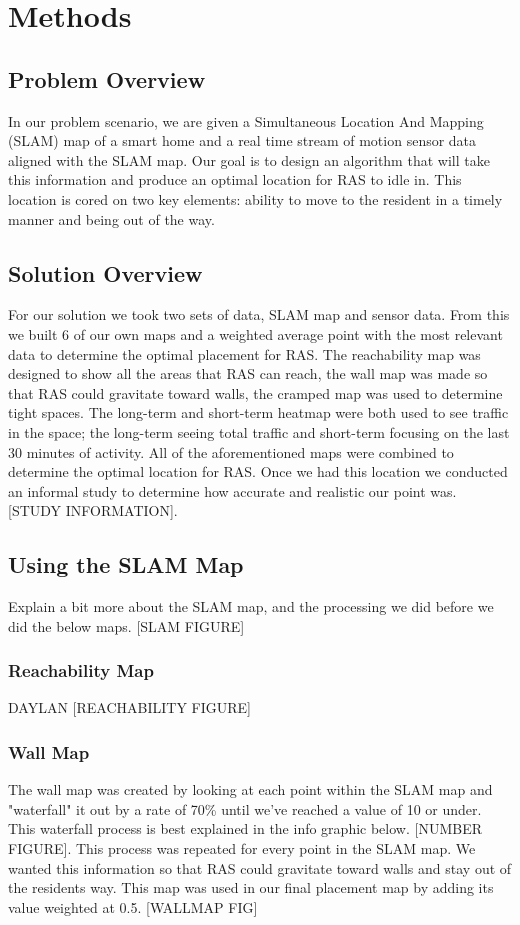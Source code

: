 \documentclass[11pt, draft, a4paper]{IEEEtran}
\begin{document}
\section{Methods}


\subsection{Problem Overview}
In our problem scenario, we are given a Simultaneous Location And Mapping (SLAM) map of a smart home and a real time stream of motion sensor data aligned with the SLAM map. Our goal is to design an algorithm that will take this information and produce an optimal location for RAS to idle in. This location is cored on two key elements: ability to move to the resident in a timely manner and being out of the way. 


\subsection{Solution Overview}
For our solution we took two sets of data, SLAM map and sensor data. From this we built 6 of our own maps and a weighted average point with the most relevant data to determine the optimal placement for RAS. The reachability map was designed to show all the areas that RAS can reach, the wall map was made so that RAS could gravitate toward walls, the cramped map was used to determine tight spaces. The long-term and short-term heatmap were both used to see traffic in the space; the long-term seeing total traffic and short-term focusing on the last 30 minutes of activity. All of the aforementioned maps were combined to determine the optimal location for RAS. Once we had this location we conducted an informal study to determine how accurate and realistic our point was. [STUDY INFORMATION].


\subsection{Using the SLAM Map}
Explain a bit more about the SLAM map, and the processing we did before we did the below maps.
[SLAM FIGURE]

\subsubsection{Reachability Map}
DAYLAN
[REACHABILITY FIGURE]


\subsubsection{Wall Map}
The wall map was created by looking at each point within the SLAM map and "waterfall" it out by a rate of 70\% until we've reached a value of 10 or under. This waterfall process is best explained in the info graphic below. [NUMBER FIGURE]. This process was repeated for every point in the SLAM map. We wanted this information so that RAS could gravitate toward walls and stay out of the residents way. This map was used in our final placement map by adding its value weighted at 0.5. [WALLMAP FIG]
\end{document}
